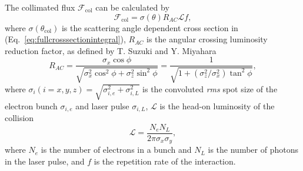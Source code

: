 \documentclass[10pt]{article}
\begin{document}
The collimated flux $\mathcal{F}_{\mathrm{col}}$ can be calculated by
\begin{equation}
\mathcal{F}_{\mathrm{col}} = \sigma\left(\theta\right)R_{AC}\mathcal{L}f,
\label{eq:collimatedflux}
\end{equation}    
where $\sigma\left(\theta_{\mathrm{col}}\right)$ is the scattering angle dependent cross section in (Eq.~\ref{eq:fullcrosssectionintegral}), $R_{AC}$ is the angular crossing luminosity reduction factor, as defined by T. Suzuki \cite{suzuki1976general} and Y. Miyahara \cite{miyahara2008luminosity}
\begin{equation}
R_{AC} = \frac{\sigma_{x}\cos\phi}{\sqrt{\sigma_{x}^{2}\cos^{2}\phi+\sigma_{z}^{2}\sin^{2}\phi}} = \frac{1}{\sqrt{1+\left(\sigma_{z}^{2}/\sigma_{x}^{2}\right)\tan^{2}\phi}},
\label{eq:angularcrossingreductionfactor}
\end{equation}
where $\sigma_{i}\left(i=x,y,z\right) = \sqrt{\sigma_{i,e}^{2}+\sigma_{i,L}^{2}}$ is the convoluted \textit{rms} spot size of the electron bunch $\sigma_{i,e}$ and laser pulse $\sigma_{i,L}$, $\mathcal{L}$ is the head-on luminosity of the collision
\begin{equation}
\mathcal{L} = \frac{N_{e}N_{L}}{2\pi\sigma_{x}\sigma_{y}},
\end{equation}
where $N_{e}$ is the number of electrons in a bunch and $N_{L}$ is the number of photons in the laser pulse, and $f$ is the repetition rate of the interaction.
\end{document}
